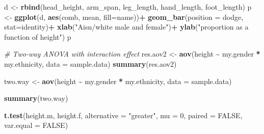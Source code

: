\documentclass[]{article}
\newenvironment{Shaded}{\begin{snugshade}}{\end{snugshade}}
\newcommand{\CommentTok}[1]{\textcolor[rgb]{0.56,0.35,0.01}{\textit{#1}}}
\newcommand{\DataTypeTok}[1]{\textcolor[rgb]{0.13,0.29,0.53}{#1}}
\newcommand{\DecValTok}[1]{\textcolor[rgb]{0.00,0.00,0.81}{#1}}
\newcommand{\KeywordTok}[1]{\textcolor[rgb]{0.13,0.29,0.53}{\textbf{#1}}}
\newcommand{\NormalTok}[1]{#1}
\newcommand{\OperatorTok}[1]{\textcolor[rgb]{0.81,0.36,0.00}{\textbf{#1}}}
\newcommand{\OtherTok}[1]{\textcolor[rgb]{0.56,0.35,0.01}{#1}}
\newcommand{\StringTok}[1]{\textcolor[rgb]{0.31,0.60,0.02}{#1}}
\begin{document}
\begin{Shaded}
\begin{Highlighting}[]
\NormalTok{d \textless{}{-}}\StringTok{ }\KeywordTok{rbind}\NormalTok{(head\_height, arm\_span, leg\_length, hand\_length, foot\_length)}
\NormalTok{p \textless{}{-}}\StringTok{ }\KeywordTok{ggplot}\NormalTok{(d, }\KeywordTok{aes}\NormalTok{(comb, mean, }\DataTypeTok{fill=}\NormalTok{name))}\OperatorTok{+}
\StringTok{      }\KeywordTok{geom\_bar}\NormalTok{(}\DataTypeTok{position =} \StringTok{\textquotesingle{}dodge\textquotesingle{}}\NormalTok{, }\DataTypeTok{stat=}\StringTok{\textquotesingle{}identity\textquotesingle{}}\NormalTok{)}\OperatorTok{+}
\StringTok{      }\KeywordTok{xlab}\NormalTok{(}\StringTok{"Aisn/white male and female"}\NormalTok{)}\OperatorTok{+}
\StringTok{      }\KeywordTok{ylab}\NormalTok{(}\StringTok{"proportion as a function of height"}\NormalTok{)}
\NormalTok{p}
\end{Highlighting}
\end{Shaded}

\begin{Shaded}
\begin{Highlighting}[]
\CommentTok{\# Two{-}way ANOVA with interaction effect}
\NormalTok{res.aov2 \textless{}{-}}\StringTok{ }\KeywordTok{aov}\NormalTok{(height }\OperatorTok{\textasciitilde{}}\StringTok{ }\NormalTok{my.gender }\OperatorTok{*}\StringTok{ }\NormalTok{my.ethnicity, }\DataTypeTok{data =}\NormalTok{ sample.data)}
\KeywordTok{summary}\NormalTok{(res.aov2)}
\end{Highlighting}
\end{Shaded}

\begin{Shaded}
\begin{Highlighting}[]
\NormalTok{two.way \textless{}{-}}\StringTok{ }\KeywordTok{aov}\NormalTok{(height }\OperatorTok{\textasciitilde{}}\StringTok{ }\NormalTok{my.gender }\OperatorTok{*}\StringTok{ }\NormalTok{my.ethnicity, }\DataTypeTok{data =}\NormalTok{ sample.data)}

\KeywordTok{summary}\NormalTok{(two.way)}
\end{Highlighting}
\end{Shaded}

\begin{Shaded}
\begin{Highlighting}[]
\KeywordTok{t.test}\NormalTok{(height.m, height.f,}
       \DataTypeTok{alternative =} \StringTok{"greater"}\NormalTok{,}
       \DataTypeTok{mu =} \DecValTok{0}\NormalTok{, }\DataTypeTok{paired =} \OtherTok{FALSE}\NormalTok{, }\DataTypeTok{var.equal =} \OtherTok{FALSE}\NormalTok{)}
\end{Highlighting}
\end{Shaded}
\end{document}

